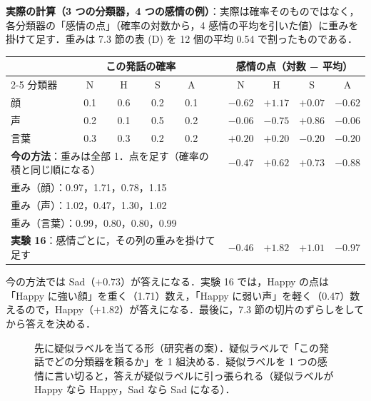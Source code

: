 \documentclass[a4paper,11pt]{ltjsarticle}
\begin{document}
\noindent\textbf{実際の計算（3 つの分類器，4 つの感情の例）}：実際は確率そのものではなく，各分類器の「感情の点」（確率の対数から，4 感情の平均を引いた値）に重みを掛けて足す．重みは 7.3 節の表 (D) を 12 個の平均 0.54 で割ったものである．
\begin{center}
\scriptsize
\setlength{\tabcolsep}{4pt}
\begin{tabular}{l cccc c cccc}
\toprule
 & \multicolumn{4}{c}{この発話の確率} & & \multicolumn{4}{c}{感情の点（対数 − 平均）} \\
\cmidrule{2-5}\cmidrule{7-10}
分類器 & N & H & S & A & & N & H & S & A \\
\midrule
顔 & 0.1 & 0.6 & 0.2 & 0.1 & & $-0.62$ & $+1.17$ & $+0.07$ & $-0.62$ \\
声 & 0.2 & 0.1 & 0.5 & 0.2 & & $-0.06$ & $-0.75$ & $+0.86$ & $-0.06$ \\
言葉 & 0.3 & 0.3 & 0.2 & 0.2 & & $+0.20$ & $+0.20$ & $-0.20$ & $-0.20$ \\
\midrule
\multicolumn{6}{l}{\textbf{今の方法}：重みは全部 1．点を足す（確率の積と同じ順になる）} & $-0.47$ & $+0.62$ & $\mathbf{+0.73}$ & $-0.88$ \\
\midrule
\multicolumn{6}{l}{重み（顔）：0.97，1.71，0.78，1.15} & & & & \\
\multicolumn{6}{l}{重み（声）：1.02，0.47，1.30，1.02} & & & & \\
\multicolumn{6}{l}{重み（言葉）：0.99，0.80，0.80，0.99} & & & & \\
\multicolumn{6}{l}{\textbf{実験 16}：感情ごとに，その列の重みを掛けて足す} & $-0.46$ & $\mathbf{+1.82}$ & $+1.01$ & $-0.97$ \\
\bottomrule
\end{tabular}
\end{center}
今の方法では Sad（$+0.73$）が答えになる．実験 16 では，Happy の点は「Happy に強い顔」を重く（1.71）数え，「Happy に弱い声」を軽く（0.47）数えるので，Happy（$+1.82$）が答えになる．最後に，7.3 節の切片のずらしをしてから答えを決める．

\begin{figure}[H]
\centering
{}
\caption{先に疑似ラベルを当てる形（研究者の案）．疑似ラベルで「この発話でどの分類器を頼るか」を 1 組決める．疑似ラベルを 1 つの感情に言い切ると，答えが疑似ラベルに引っ張られる（疑似ラベルが Happy なら Happy，Sad なら Sad になる）．}
\end{figure}
\end{document}
